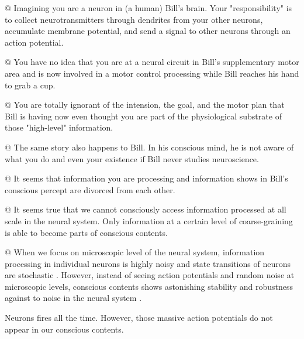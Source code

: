 \documentclass[utf8]{article}
\newenvironment{ants}
			{
			 \begin{easylist}[itemize]
			}
			{
			\end{easylist}
			}
\begin{document}
		\begin{ants}
			
				@ Imagining you are a neuron in (a human) Bill's brain. Your "responsibility" is to collect neurotransmitters through dendrites from your other neurons, accumulate membrane potential, and send a signal to other neurons through an action potential. 
				
				@ You have no idea that you are at a neural circuit in Bill's supplementary motor area and is now involved in a motor control processing while Bill reaches his hand to grab a cup. 
				
				@  You are totally ignorant of the intension, the goal, and the motor plan that Bill is having now even thought you are part of the physiological substrate of those "high-level" information. 
				
				@ The same story also happens to Bill. In his conscious mind, he is not aware of what you do and even your existence if Bill never studies neuroscience.
				
				@ It seems that information you are processing and information shows in Bill's conscious percept are divorced from each other. 
				
				
				
				
				
%			
			
			
				
				@ It seems true that we cannot consciously access information processed at all scale in the neural system. Only information at a certain level of coarse-graining is able to become parts of conscious contents. 
				
				@ When we focus on microscopic level of the neural system, information processing in individual neurons is highly noisy and state transitions of neurons are stochastic \citep{Goldwyn2011, White2000}. However, instead of seeing action potentials and random noise at microscopic levels, conscious contents shows astonishing stability and robustness against to noise in the neural system \citep{mathis1995computational}.
				
				
				 Neurons fires all the time. However, those massive action potentials do not appear in our conscious contents. 
			

\end{ants}
\end{document}
